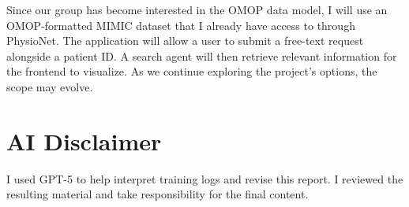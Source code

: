 \documentclass[11pt]{article}
\begin{document}
Since our group has become interested in the OMOP data model, I will use an
OMOP-formatted MIMIC dataset that I already have access to through PhysioNet.
The application will allow a user to submit a free-text request alongside a
patient ID. A search agent will then retrieve relevant information for the
frontend to visualize. As we continue exploring the project's options, the
scope may evolve.

\section{AI Disclaimer}

I used GPT-5 to help interpret training logs and revise this report. I
reviewed the resulting material and take responsibility for the final content.
\end{document}
